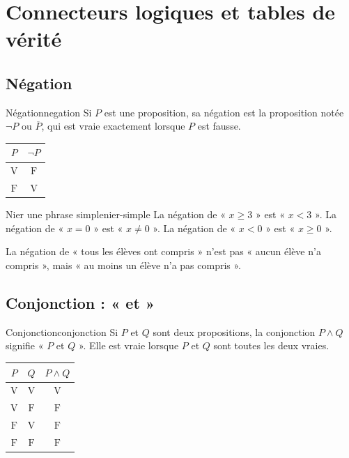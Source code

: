 \documentclass[11pt,a4paper]{article}
\newcommand{\V}{\mathrm{V}}
\newcommand{\F}{\mathrm{F}}
\begin{document}
\section{Connecteurs logiques et tables de vérité}

\subsection{Négation}

\begin{definitionbox}{Négation}{negation}
Si $P$ est une proposition, sa négation est la proposition notée $\neg P$ ou $\overline P$, qui est vraie exactement lorsque $P$ est fausse.
\end{definitionbox}

\begin{center}
\begin{tabular}{c|c}
$P$ & $\neg P$ \\
\hline
$\V$ & $\F$ \\
$\F$ & $\V$
\end{tabular}
\end{center}

\begin{exemplebox}{Nier une phrase simple}{nier-simple}
La négation de « $x\geq 3$ » est « $x<3$ ». La négation de « $x=0$ » est « $x\neq 0$ ». La négation de « $x<0$ » est « $x\geq 0$ ».
\end{exemplebox}

\begin{erreurbox}
La négation de « tous les élèves ont compris » n'est pas « aucun élève n'a compris », mais « au moins un élève n'a pas compris ».
\end{erreurbox}

\subsection{Conjonction : « et »}

\begin{definitionbox}{Conjonction}{conjonction}
Si $P$ et $Q$ sont deux propositions, la conjonction $P\land Q$ signifie « $P$ et $Q$ ». Elle est vraie lorsque $P$ et $Q$ sont toutes les deux vraies.
\end{definitionbox}

\begin{center}
\begin{tabular}{c|c|c}
$P$ & $Q$ & $P\land Q$ \\
\hline
$\V$ & $\V$ & $\V$ \\
$\V$ & $\F$ & $\F$ \\
$\F$ & $\V$ & $\F$ \\
$\F$ & $\F$ & $\F$
\end{tabular}
\end{center}
\end{document}
